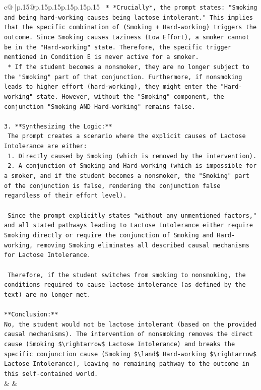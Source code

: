 \documentclass{article}
\begin{document}
{\begin{supertabular}{c@{$\;$}|p{.15\linewidth}@{}p{.15\linewidth}p{.15\linewidth}p{.15\linewidth}p{.15\linewidth}p{.15\linewidth}}
{{{\texttt{        *   *Crucially*, the prompt states: "Smoking and being hard{-}working causes being lactose intolerant." This implies that the specific combination of (Smoking + Hard{-}working) triggers the outcome. Since Smoking causes Laziness (Low Effort), a smoker cannot be in the "Hard{-}working" state. Therefore, the specific trigger mentioned in Condition E is never active for a smoker.} \\
\texttt{        *   If the student becomes a nonsmoker, they are no longer subject to the "Smoking" part of that conjunction. Furthermore, if nonsmoking leads to higher effort (hard{-}working), they might enter the "Hard{-}working" state. However, without the "Smoking" component, the conjunction "Smoking AND Hard{-}working" remains false.} \\
\\ 
\texttt{3.  **Synthesizing the Logic:**} \\
\texttt{    The prompt creates a scenario where the explicit causes of Lactose Intolerance are either:} \\
\texttt{    1.  Directly caused by Smoking (which is removed by the intervention).} \\
\texttt{    2.  A conjunction of Smoking and Hard{-}working (which is impossible for a smoker, and if the student becomes a nonsmoker, the "Smoking" part of the conjunction is false, rendering the conjunction false regardless of their effort level).} \\
\\ 
\texttt{    Since the prompt explicitly states "without any unmentioned factors," and all stated pathways leading to Lactose Intolerance either require Smoking directly or require the conjunction of Smoking and Hard{-}working, removing Smoking eliminates all described causal mechanisms for Lactose Intolerance.} \\
\\ 
\texttt{    Therefore, if the student switches from smoking to nonsmoking, the conditions required to cause lactose intolerance (as defined by the text) are no longer met.} \\
\\ 
\texttt{**Conclusion:**} \\
\texttt{No, the student would not be lactose intolerant (based on the provided causal mechanisms). The intervention of nonsmoking removes the direct cause (Smoking \$\textbackslash{}rightarrow\$ Lactose Intolerance) and breaks the specific conjunction cause (Smoking \$\textbackslash{}land\$ Hard{-}working \$\textbackslash{}rightarrow\$ Lactose Intolerance), leaving no remaining pathway to the outcome in this self{-}contained world.} \\
            }
        }
    }
    & & \\ \\


\end{supertabular}}
\end{document}
